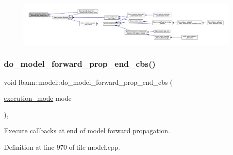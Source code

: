 \begin{figure}[H]
\begin{center}
\leavevmode
\includegraphics[width=350pt]{classlbann_1_1model_af3c45642bbacf1bd07e8504d7e689ec0_icgraph}
\end{center}
\end{figure}
\mbox{\label{classlbann_1_1model_a9d67f4f3a027327d2db8767759f9c2bf}} 
\subsubsection{\texorpdfstring{do\+\_\+model\+\_\+forward\+\_\+prop\+\_\+end\+\_\+cbs()}{do\_model\_forward\_prop\_end\_cbs()}}
{\footnotesize\ttfamily void lbann\+::model\+::do\+\_\+model\+\_\+forward\+\_\+prop\+\_\+end\+\_\+cbs (\begin{DoxyParamCaption}\item[{\hyperlink{base_8hpp_a2781a159088df64ed7d47cc91c4dc0a8}{execution\+\_\+mode}}]{mode }\end{DoxyParamCaption})\hspace{0.3cm}{\ttfamily [protected]}, {\ttfamily [virtual]}}

Execute callbacks at end of model forward propagation. 

Definition at line 970 of file model.\+cpp.


